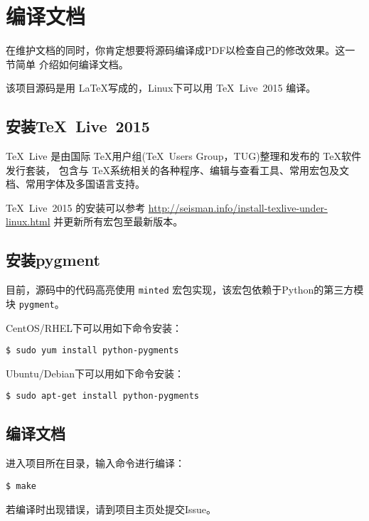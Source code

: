 \section{编译文档}
在维护文档的同时，你肯定想要将源码编译成PDF以检查自己的修改效果。这一节简单
介绍如何编译文档。

该项目源码是用 \LaTeX 写成的，Linux下可以用 \TeX~Live~2015 编译。

\subsection{安装\TeX~Live~2015}
\TeX~Live 是由国际 \TeX 用户组(\TeX~Users Group，TUG)整理和发布的 \TeX 软件发行套装，
包含与 \TeX 系统相关的各种程序、编辑与查看工具、常用宏包及文档、常用字体及多国语言支持。

\TeX~Live~2015 的安装可以参考 \url{http://seisman.info/install-texlive-under-linux.html}
并更新所有宏包至最新版本。

\subsection{安装pygment}
目前，源码中的代码高亮使用 \texttt{minted} 宏包实现，该宏包依赖于Python的第三方模块 \texttt{pygment}。

CentOS/RHEL下可以用如下命令安装：
\begin{verbatim}
$ sudo yum install python-pygments
\end{verbatim}

Ubuntu/Debian下可以用如下命令安装：
\begin{verbatim}
$ sudo apt-get install python-pygments
\end{verbatim}

\subsection{编译文档}
进入项目所在目录，输入命令进行编译：
\begin{verbatim}
$ make
\end{verbatim}
若编译时出现错误，请到项目主页处提交Issue。
